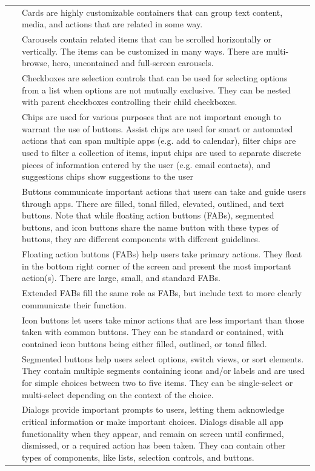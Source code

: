 \documentclass[11pt,titlepage,oneside,openany]{book}
\begin{document}
\begin{longtable}{|p{}|p{}|}
	~ & Cards are highly customizable containers that can group text content, media, and actions that are related in some way. \\ 
	~ & Carousels contain related items that can be scrolled horizontally or vertically. The items can be customized in many ways. There are multi-browse, hero, uncontained and full-screen carousels. \\ 
	~ & Checkboxes are selection controls that can be used for selecting options from a list when options are not mutually exclusive. They can be nested with parent checkboxes controlling their child checkboxes. \\ 
	~ & Chips are used for various purposes that are not important enough to warrant the use of buttons. Assist chips are used for smart or automated actions that can span multiple apps (e.g. add to calendar), filter chips are used to filter a collection of items, input chips are used to separate discrete pieces of information entered by the user (e.g. email contacts), and suggestions chips show suggestions to the user \\ 
	~ & Buttons communicate important actions that users can take and guide users through apps. There are filled, tonal filled, elevated, outlined, and text buttons. Note that while floating action buttons (FABs), segmented buttons, and icon buttons share the name button with these types of buttons, they are different components with different guidelines. \\ 
	~ & Floating action buttons (FABs) help users take primary actions. They float in the bottom right corner of the screen and present the most important action(s). There are large, small, and standard FABs. \\ 
	~ & Extended FABs fill the same role as FABs, but include text to more clearly communicate their function. \\ 
	~ & Icon buttons let users take minor actions that are less important than those taken with common buttons. They can be standard or contained, with contained icon buttons being either filled, outlined, or tonal filled. \\ 
	~ & Segmented buttons help users select options, switch views, or sort elements. They contain multiple segments containing icons and/or labels and are used for simple choices between two to five items. They can be single-select or multi-select depending on the context of the choice. \\ 
	~ & Dialogs provide important prompts to users, letting them acknowledge critical information or make important choices. Dialogs disable all app functionality when they appear, and remain on screen until confirmed, dismissed, or a required action has been taken. They can contain other types of components, like lists, selection controls, and buttons. \\ 

\end{longtable}
\end{document}
